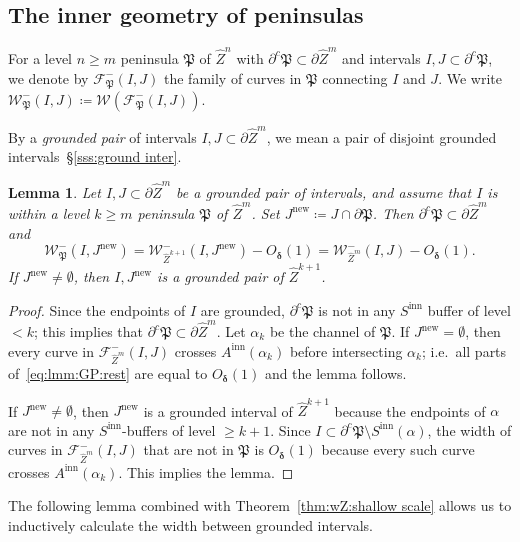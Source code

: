 \documentclass{amsart}
\newcommand{\1}{{\mathbb 1 }}
\newcommand{\Fam}{{\mathcal F}}
\newcommand{\Width}{{\mathcal W}}
\newcommand{\wZ}{{\widehat Z}}
\newcommand\inn{{\operatorname{inn}}}
\newcommand\new{{\operatorname{new}}}
\newtheorem{lem}[thm]{Lemma}
\theoremstyle{remark}
\numberwithin{equation}{section}
\theoremstyle{definition}
\newcommand{\Penin}{{\mathfrak P}}
\newcommand{\bdelta}{{\boldsymbol{ \delta}}}
\begin{document}
\subsection{The inner geometry of peninsulas}\label{ss:peninsulas:geometry} For a level $n\ge m$ peninsula $\Penin$ of $\wZ^n$ with $\partial ^c\Penin\subset \partial \wZ^m$ and intervals $I,J\subset \partial ^c\Penin$, we denote by $\Fam_\Penin^-(I,J)$ the family of curves in $\Penin$ connecting $I$ and $J$. We write $\Width^-_\Penin(I,J)\coloneqq \Width(\Fam^-_\Penin(I,J))$.

By a \emph{grounded pair} of intervals $I,J\subset\partial \wZ^m$, we mean a pair of disjoint grounded intervals~\S\ref{sss:ground inter}.

\begin{lem}
\label{lmm:GP:rest}
Let $I,J\subset \partial \wZ^m$ be a grounded pair of intervals, and assume that $I$ is within a level $k\ge m$ peninsula $\Penin$ of $\wZ^m$. Set $J^\new\coloneqq J\cap \partial \Penin$. Then $\partial ^c\Penin\subset \partial \wZ^m$ and
\begin{equation}
\label{eq:lmm:GP:rest}
\Width^-_\Penin(I,J^\new)=\Width^-_{\wZ^{k+1}}(I,J^\new)-O_\bdelta(1)= \Width_{\wZ^m}^-(I,J)-O_\bdelta(1).
\end{equation}
If $J^\new \not=\emptyset$, then $I,J^\new$ is a grounded pair of $\wZ^{k+1}$.
\end{lem}
\begin{proof}

Since the endpoints of $I$ are grounded, $\partial^c \Penin$ is not in any $S^\inn$ buffer of level $<k$; this implies that  $\partial^c \Penin\subset \partial \wZ^m$. Let $\alpha_k$ be the channel of $\Penin$. If $J^\new=\emptyset$, then every curve in $\Fam^-_{\wZ^m}(I,J)$ crosses $A^\inn(\alpha_k)$ before intersecting $\alpha_k$; i.e.~all parts of~\eqref{eq:lmm:GP:rest} are equal to $O_{\bdelta}(1)$ and the lemma follows. 



If $J^\new\not=\emptyset$, then  $J^\new$ is a grounded interval of $\wZ^{k+1}$ because the endpoints of $\alpha$ are not in any $S^\inn$-buffers of level $\ge k+1$. Since $I\subset \partial ^c\Penin\setminus S^\inn (\alpha)$, the width of curves in $\Fam^-_{\wZ^m}(I,J)$ that are not in $\Penin$ is $O_{\bdelta}(1)$ because every such curve crosses $A^\inn(\alpha_k)$. This implies the lemma. 
\end{proof}

The following lemma combined with Theorem~\ref{thm:wZ:shallow scale} allows us to inductively calculate the width between grounded intervals.
\end{document}
